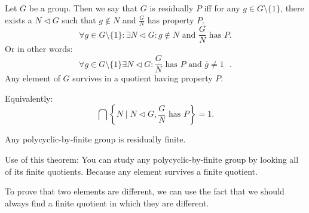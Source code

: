 \begin{definition}[residually]
    Let $G$ be a group. Then we say that $G$ is residually $P$ iff for any  $g \in G \setminus \{1\} $, there exists a $N \triangleleft G$ such that $g \not\in N$ and $\frac{G}{N}$ has property $P$. 
    \[
    \forall g \in G \setminus \{1\} : \exists N \triangleleft G : g \not\in N \text{ and } \frac{G}{N} \text{ has $P$}
    .\] 
    Or in other words:
    \[
        \forall g \in G \setminus \{1\}  \exists N \triangleleft G : \frac{G}{N} \text{ has $P$ and $\overline{g} \neq 1$ }
    .\] 
    Any element of $G$ survives in a quotient having property $P$.

    Equivalently:
    \[
    \bigcap \left\{N  \mid  N\triangleleft G, \frac{G}{N} \text{ has $P$}\right\}  = 1
    .\] 
\end{definition}

\begin{theorem}
    Any polycyclic-by-finite group is residually finite.
\end{theorem}

Use of this theorem: You can study any polycyclic-by-finite group by looking all of its finite quotients.
Because any element survives a finite quotient.
\begin{eg}
    To prove that two elements are different, we can use the fact that we should always find a finite quotient in which they are different.
\end{eg}

